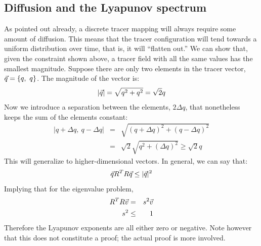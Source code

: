 \documentclass{article}
\begin{document}
\subsection{Diffusion and the Lyapunov spectrum}

\label{Lyapunov_exponents_less_than_zero}

As pointed out already, a discrete tracer mapping will always require some 
amount of diffusion.  This means that the tracer configuration will 
tend towards a uniform distribution over time, 
that is, it will ``flatten out.''  We can
show that, given the constraint shown above, 
a tracer field with all the same values has the smallest magnitude.  
Suppose there are only two elements in the 
tracer vector, $\vec q=\lbrace q,~q \rbrace$.  The magnitude of the vector is:
\begin{equation}
|\vec q|=\sqrt{q^2+q^2}=\sqrt{2} q
\end{equation}
Now we introduce a separation between the elements, $2\Delta q$, that 
nonetheless keeps the sum of the elements constant:
\begin{eqnarray}
|q+\Delta q,~q-\Delta q| & = & \sqrt{(q+\Delta q)^2+(q-\Delta q)^2} \\
& = & \sqrt{2}\sqrt{q^2+(\Delta q)^2} \ge \sqrt{2} q
\end{eqnarray}
This will generalize to higher-dimensional vectors.  In general, we can
say that:
\begin{equation}
\vec q R^T R \vec q \le | \vec q |^2
\label{tracer_map_inequality}
\end{equation}
Implying that for the eigenvalue problem,
\begin{eqnarray}
R^T R \vec v & = & s^2 \vec v \nonumber\\
s^2 & \le & 1 \label{SV_inequality}
\end{eqnarray}
Therefore the Lyapunov exponents are all
either zero or negative.
Note however that this does not constitute a proof; the actual proof is more 
involved.
\end{document}
